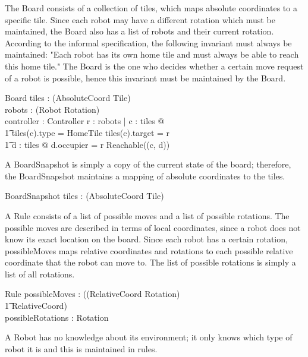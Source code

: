 \documentclass[12pt]{article}
\begin{document}
The Board consists of a collection of tiles, which maps absolute coordinates to a specific tile. Since each robot may have a different rotation which must be maintained, the Board also has a list of robots and their current rotation. \\
According to the informal specification, the following invariant must always be maintained: "Each robot has its own home tile and must always be able to reach this home tile." The Board is the one who decides whether a certain move request of a robot is possible, hence this invariant must be maintained by the Board.

\begin{schema}{Board}
tiles : \power (AbsoluteCoord \fun Tile) \\
robots : \power (Robot \fun Rotation) \\
controller : Controller
\where
\forall r : robots | \exists c : \dom tiles @  \\ \t1 tiles(c).type = HomeTile \wedge tiles(c).target = r \wedge \\ \t1
\exists d : \dom tiles @ d.occupier = r \wedge Reachable((c, d))
\end{schema}

A BoardSnapshot is simply a copy of the current state of the board; therefore, the BoardSnapshot maintains a mapping of absolute coordinates to the tiles.

\begin{schema}{BoardSnapshot}
tiles : \power (AbsoluteCoord \fun Tile) \\
\end{schema}

A Rule consists of a list of possible moves and a list of possible rotations. The possible moves are described in terms of local coordinates, since a robot does not know its exact location on the board. Since each robot has a certain rotation, possibleMoves maps relative coordinates and rotations to each possible relative coordinate that the robot can move to. The list of possible rotations is simply a list of all rotations.

\begin{schema}{Rule}
possibleMoves : \power ((RelativeCoord \times Rotation) \psurj \\ \t1 \seq RelativeCoord) \\
possibleRotations : \power Rotation
\end{schema}

A Robot has no knowledge about its environment; it only knows which type of robot it is and this is maintained in rules.
\end{document}
